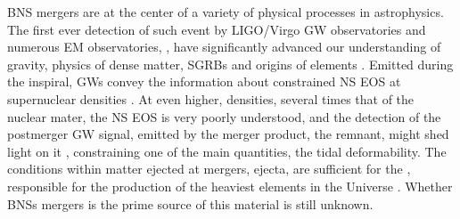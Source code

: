 %
%


\ac{BNS} mergers are at the center of a variety of physical processes in astrophysics.
The first ever detection of such event by LIGO/Virgo \ac{GW} observatories and 
numerous \ac{EM} observatories, \GW{}, have significantly advanced our understanding 
of gravity, physics of dense matter, \acp{SGRB} and origins of \rproc{} elements 
\cite{1,2,3}. 
%
Emitted during the inspiral, \acp{GW} convey the information about  
constrained \ac{NS} \ac{EOS} at supernuclear densities \cite{5,6,7}. At even higher, 
densities, several times that of the nuclear mater, the \ac{NS} \ac{EOS} is very 
poorly understood, and the detection of the postmerger \ac{GW} signal, 
emitted by the merger product, the remnant, might shed light on it \cite{8,9,10,11}, 
constraining one of the main quantities, the tidal deformability.
%
The conditions within matter ejected at mergers, ejecta, are sufficient for the \rproc{} 
\nuc{}, responsible for the production of the heaviest elements in the Universe
\cite{12}.
Whether \acp{BNS} mergers is the prime source of this material is still unknown.

